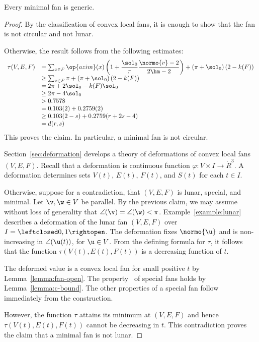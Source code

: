 \begin{lemma}[]\label{lemma:circular-nonmin}
Every minimal fan is generic.
\end{lemma}

\begin{proof}
  By the classification of convex local fans, it is enough to show
  that the fan is not circular and not lunar.

Otherwise, the result follows from the following estimates:
\begin{displaymath}
\begin{array}{lll}
  \tau(V,E,F) &=\sum_{x\in F} \op{azim}(x)
  \left(1 + \dfrac{\sol_0}{\pi}  \dfrac{\normo{v}-2}{2\hm-2}\right) 
+ \left(\pi+{\sol_0}\right) (2- k(F))\\
  &\ge \sum_{x\in F} \pi + \left(\pi+{\sol_0}\right) (2- k(F))\\
  &= 2\pi + 2\sol_0 - k(F) \sol_0\\
  &\ge 2\pi - 4\sol_0\\
  &> 0.7578\\
  &=0.103 (2) + 0.2759 (2)\\
  &\ge 0.103 (2-s) + 0.2759 (r+2s-4) \\ 
  &= d(r,s)\\
\end{array}
\end{displaymath}
This proves the claim.  In particular, a minimal fan is not circular.


Section~\ref{sec:deformation} develops a theory of deformations of
convex local fans $(V,E,F)$.  Recall that a deformation is continuous
function $\varphi:V\times I\to\ring{R}^3$.  A deformation determines
sets $V(t)$, $E(t)$, $F(t)$, and $S(t)$ for each $t\in I$.


  Otherwise, suppose for a
contradiction, that $(V,E,F)$ is lunar, special, and minimal.  Let
$\v,\w\in V$ be parallel.  By the previous claim, we may assume
without loss of generality that $\angle(\v)=\angle(\w)<\pi$.
Example~\ref{example:lunar} describes a deformation of the lunar fan
$(V,E,F)$ over $I=\leftclosed0,1\rightopen$.  The deformation fixes
$\normo{\u}$ and is non-increasing in $\angle(\u(t))$, for $\u\in V$.
From the defining formula for $\tau$, it follows that the function
$\tau(V(t),E(t),F(t))$ is a decreasing function of $t$.

  The deformed value is a convex local fan for small positive
$t$ by Lemma~\ref{lemma:fan-open}.  The property~ of
special fans holds by Lemma~\ref{lemma:c-bound}.  The other properties
of a special fan follow immediately from the construction.

However, the function $\tau$ attains its minimum at $(V,E,F)$ and
hence $\tau(V(t),E(t),F(t))$ cannot be decreasing in $t$.  This
contradiction proves the claim that a minimal fan is not lunar.
\end{proof}

